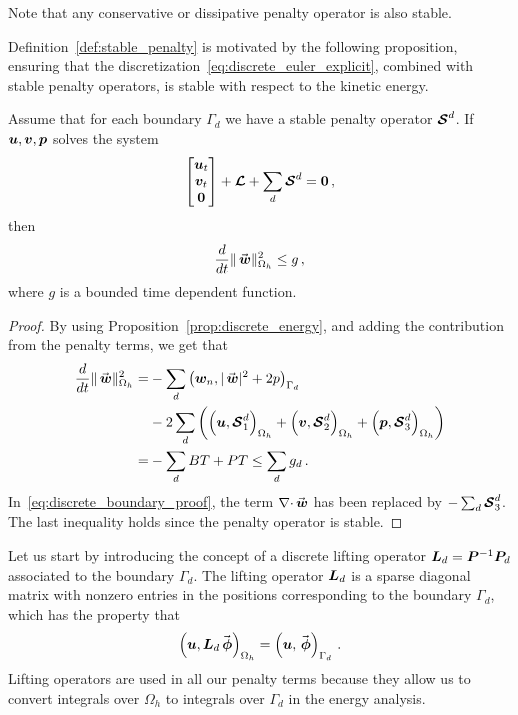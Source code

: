 \begin{remark}
  Note that any conservative or dissipative penalty operator is also stable.
\end{remark}

Definition~\ref{def:stable_penalty} is motivated by the following proposition, ensuring that the discretization~\eqref{eq:discrete_euler_explicit}, combined with stable penalty operators, is stable with respect to the kinetic energy.

\begin{proposition}
  Assume that for each boundary $\Gamma_d$ we have a stable penalty operator $\bm{\mathcal{S}}^d$. If $\bm{u}, \bm{v}, \bm{p}$ solves the system
  \begin{equation*}
    \begin{bmatrix}
      \bm{u}_t \\
      \bm{v}_t \\
      \bm{0}
    \end{bmatrix}
    + \bm{\mathcal{L}} + \sum_d \bm{\mathcal{S}}^d = \bm{0} \,,
  \end{equation*}
  then
  \begin{equation*}
    \frac{d}{dt} \normn{\wn}^2 \leq g \,,
  \end{equation*}
  where $g$ is a bounded time dependent function.
\end{proposition}

\begin{proof}
 By using Proposition~\ref{prop:discrete_energy}, and adding the contribution from the penalty terms, we get that
\begin{equation}
\begin{aligned}
   \frac{d}{dt} \|\wn\|_{\Omega_h}^2
   = & - \sum_d\ipbn{\wnn}{|\wn|^2 + 2p} \\
    & - 2 \sum_d
    \left( \ipn{\un}{\satn_1^d} + \ipn{\vn}{\satn_2^d} + \ipn{\pn}{\satn_3^d}\right)
    \\
    =& - \sum_d BT + PT \le \sum_d g_d
    \,.
\end{aligned}
\label{eq:discrete_boundary_proof}
\end{equation}
In~\eqref{eq:discrete_boundary_proof}, the term $\div \wn$ has been replaced by $- \sum_d\bm{\mathcal{S}}^d_3$. The last inequality holds since the penalty operator is stable.
\end{proof}

Let us start by introducing the concept of a discrete lifting operator $\bm{L}_d = \bm{P}^{-1} \bm{P}_d$ associated to the boundary $\Gamma_d$. The lifting operator $\bm{L}_d$ is a sparse diagonal matrix with nonzero entries in the positions corresponding to the boundary $\Gamma_d$, which has the property that
\begin{equation}
  \ipn{\un}{\Lng \phin} = \ipbn{\un}{\phin} \,.
\end{equation}
Lifting operators are used in all our penalty terms because they allow us to convert integrals over $\Omega_h$ to integrals over $\Gamma_d$ in the energy analysis.

